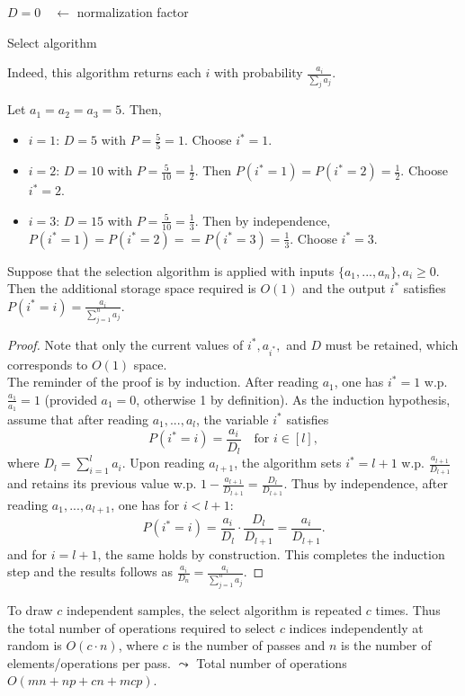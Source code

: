 \begin{algorithm}[H]
\SetAlgoLined
{}
 \BlankLine
$D= 0 \quad \leftarrow$ normalization factor \\
\caption{Select algorithm}
\end{algorithm}
\begin{remark*}
Indeed, this algorithm returns each $i$ with probability $\frac{a_i}{\sum_j a_j}$.
\end{remark*}
\begin{example*}
Let $a_1=a_2=a_3 =5$. Then,
\begin{itemize}[itemsep=0pt]
	\item $i=1$: $D=5$ with $P=\frac{5}{5}=1$. Choose $i^* =1$.
	\item $i=2$: $D=10$ with $P=\frac{5}{10}=\frac{1}{2}$. Then $P(i^*=1)=P(i^*=2)=\frac{1}{2}$. Choose $i^* = 2$.
	\item $i=3$: $D=15$ with $P=\frac{5}{10}=\frac{1}{3}$. Then by independence, $P(i^*=1)=P(i^*=2)==P(i^*=3)=\frac{1}{3}$. Choose $i^* = 3$.
\end{itemize} 
\end{example*}
\begin{lemma}
Suppose that the selection algorithm is applied with inputs $\{a_1,...,a_n\}, a_i \geq 0$. Then the additional storage space required is $O(1)$ and the output $i^*$ satisfies $P(i^*=i) = \frac{a_i}{\sum_{j=1}^n a_j}$.
\begin{proof}
Note that only the current values of $i^*, a_{i^*},$ and $D$ must be retained, which corresponds to $O(1)$ space.\\
The reminder of the proof is by induction. After reading $a_1$, one has $i^*=1$ w.p. $\frac{a_1}{a_1}=1$ (provided $a_1=0$, otherwise 1 by definition). As the induction hypothesis, assume that after reading $a_1,...,a_l$, the variable $i^*$ satisfies $$P(i^*=i) = \frac{a_i}{D_l}\quad \text{for } i \in [l],$$
where $D_l = \sum_{i=1}^l a_i$. Upon reading $a_{l+1}$, the algorithm sets $i^*=l+1$ w.p. $\frac{a_{l+1}}{D_{l+1}}$ and retains its previous value w.p. $1-\frac{a_{l+1}}{D_{l+1}}  = \frac{D_l}{D_{l+1}}$. Thus by independence, after reading $a_1,...,a_{l+1}$, one has for $i< l+1$: $$P(i^*=i)=\frac{a_i}{D_l}\cdot \frac{D_l}{D_{l+1}}=\frac{a_i}{D_{l+1}}.$$ and for $i=l+1$, the same holds by construction. This completes the induction step and the results follows as $\frac{a_i}{D_n} = \frac{a_i}{\sum_{j=1}^n a_j}$.
\end{proof}
\end{lemma}
To draw $c$ independent samples, the select algorithm is repeated $c$ times. Thus the total number of operations required to select $c$ indices independently at random is $O(c \cdot n)$, where $c$ is the number of passes and $n$ is the number of elements/operations per pass. $\leadsto$ Total number of operations $O(mn + np + cn +mcp)$.
